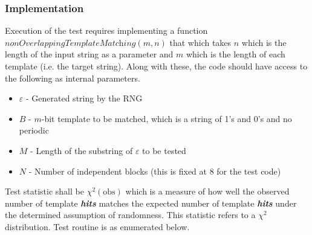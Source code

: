 \subsubsection{Implementation}

Execution of the test requires implementing a function $\textit{nonOverlappingTemplateMatching}(m,n)$ that which takes $n$ which is the length of the input string as a parameter and $m$ which is the length of each template (i.e. the target string). Along with these, the code should have access to the following as internal parameters.

\begin{itemize}
    \item $\varepsilon$ - Generated string by the RNG
    \item $B$ - $m$-bit template to be matched, which is a string of 1's and 0's and no periodic
    \item $M$ - Length of the substring of $\varepsilon$ to be tested
    \item $N$ - Number of independent blocks (this is fixed at 8 for the test code)
\end{itemize}

Test statistic shall be $\chi^2(\text{obs})$ which is a measure of how well the observed number of template \textit{\textbf{hits}} matches the expected number of template \textit{\textbf{hits}} under the determined assumption of randomness. This statistic refers to a $\chi^2$  distribution. Test routine is as enumerated below.

